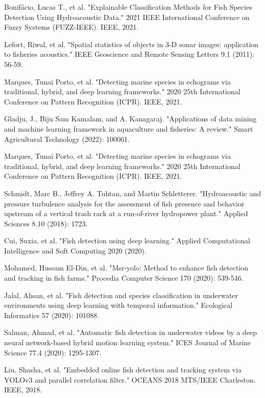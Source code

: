 \documentclass[conference]{IEEEtran}
\begin{document}
\begin{thebibliography}{00}
 Bonifácio, Lucas T., et al. "Explainable Classification Methods for Fish Species Detection Using Hydroacoustic Data." 2021 IEEE International Conference on Fuzzy Systems (FUZZ-IEEE). IEEE, 2021.

 Lefort, Riwal, et al. "Spatial statistics of objects in 3-D sonar images: application to fisheries acoustics." IEEE Geoscience and Remote Sensing Letters 9.1 (2011): 56-59.

 Marques, Tunai Porto, et al. "Detecting marine species in echograms via traditional, hybrid, and deep learning frameworks." 2020 25th International Conference on Pattern Recognition (ICPR). IEEE, 2021.

 Gladju, J., Biju Sam Kamalam, and A. Kanagaraj. "Applications of data mining and machine learning framework in aquaculture and fisheries: A review." Smart Agricultural Technology (2022): 100061.

 Marques, Tunai Porto, et al. "Detecting marine species in echograms via traditional, hybrid, and deep learning frameworks." 2020 25th International Conference on Pattern Recognition (ICPR). IEEE, 2021.

 Schmidt, Marc B., Jeffrey A. Tuhtan, and Martin Schletterer. "Hydroacoustic and pressure turbulence analysis for the assessment of fish presence and behavior upstream of a vertical trash rack at a run-of-river hydropower plant." Applied Sciences 8.10 (2018): 1723.

 Cui, Suxia, et al. "Fish detection using deep learning." Applied Computational Intelligence and Soft Computing 2020 (2020).

 Mohamed, Hussam El-Din, et al. "Msr-yolo: Method to enhance fish detection and tracking in fish farms." Procedia Computer Science 170 (2020): 539-546.

 Jalal, Ahsan, et al. "Fish detection and species classification in underwater environments using deep learning with temporal information." Ecological Informatics 57 (2020): 101088.

 Salman, Ahmad, et al. "Automatic fish detection in underwater videos by a deep neural network-based hybrid motion learning system." ICES Journal of Marine Science 77.4 (2020): 1295-1307.

 Liu, Shasha, et al. "Embedded online fish detection and tracking system via YOLOv3 and parallel correlation filter." OCEANS 2018 MTS/IEEE Charleston. IEEE, 2018.









\end{thebibliography}
\end{document}
